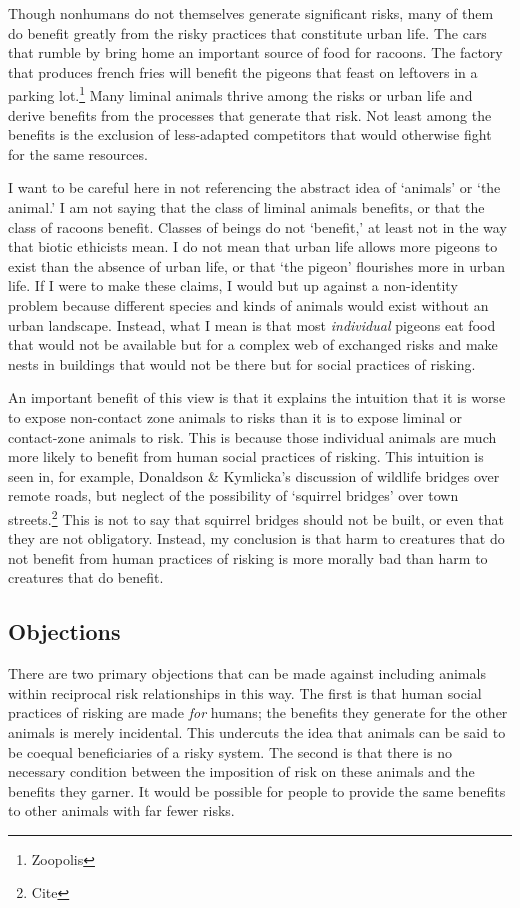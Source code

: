 Though nonhumans do not themselves generate significant risks, many of them do
benefit greatly from the risky practices that constitute urban life. The cars
that rumble by bring home an important source of food for racoons. The factory
that produces french fries will benefit the pigeons that feast on leftovers in
a parking lot.\footnote{Zoopolis} Many liminal animals thrive among the risks
or urban life and derive benefits from the processes that generate that risk.
Not least among the benefits is the exclusion of less-adapted competitors that
would otherwise fight for the same resources.

I want to be careful here in not referencing the abstract idea of ‘animals’ or
‘the animal.’ I am not saying that the class of liminal animals benefits, or
that the class of racoons benefit. Classes of beings do not ‘benefit,’ at least
not in the way that biotic ethicists mean. I do not mean that urban life allows
more pigeons to exist than the absence of urban life, or that ‘the pigeon’
flourishes more in urban life. If I were to make these claims, I would but up
against a non-identity problem because different species and kinds of animals
would exist without an urban landscape. Instead, what I mean is that most
\emph{individual} pigeons eat food that would not be available but for a complex
web of exchanged risks and make nests in buildings that would not be there but
for social practices of risking.

An important benefit of this view is that it explains the intuition that it is
worse to expose non-contact zone animals to risks than it is to expose liminal
or contact-zone animals to risk. This is because those individual animals are
much more likely to benefit from human social practices of risking. This
intuition is seen in, for example, Donaldson \& Kymlicka’s discussion of
wildlife bridges over remote roads, but neglect of the possibility of ‘squirrel
bridges’ over town streets.\footnote{Cite} This is not to say that squirrel
bridges should not be built, or even that they are not obligatory. Instead, my
conclusion is that harm to creatures that do not benefit from human practices
of risking is more morally bad than harm to creatures that do benefit.

\subsection{Objections}

There are two primary objections that can be made against including animals
within reciprocal risk relationships in this way. The first is that human
social practices of risking are made \emph{for} humans; the benefits they
generate for the other animals is merely incidental. This undercuts the idea
that animals can be said to be coequal beneficiaries of a risky system.
The second is that there is no necessary condition between the imposition of
risk on these animals and the benefits they garner. It would be possible for
people to provide the same benefits to other animals with far fewer risks.


